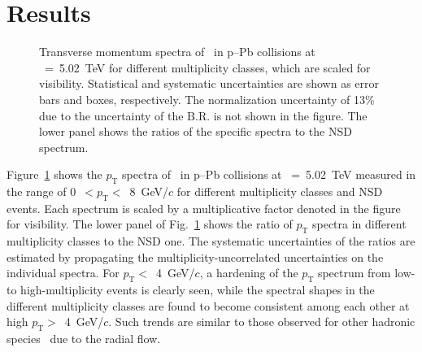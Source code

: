 
\section {Results}
\label{sec:results}

\begin{figure}[!hbt]
	\centering
	\caption{ Transverse momentum spectra of \fzero~in p--Pb collisions at \snn~=~5.02~TeV for different multiplicity classes, which are scaled for visibility. Statistical and systematic uncertainties are shown as error bars and boxes, respectively. The normalization uncertainty of 13\% due to the uncertainty of the $\mathrm{B.R.}$ is not shown in the figure. The lower panel shows the ratios of the specific spectra to the NSD spectrum. }
	\label{fig:pt}
\end{figure}

Figure~\ref{fig:pt} shows the $p_{\mathrm{T}}$ spectra of \fzero~in p--Pb collisions at \snn~=~5.02~TeV measured in the range of 0~$<p_{\mathrm{T}}<$~8~GeV/$c$ for different multiplicity classes and NSD events. Each spectrum is scaled by a multiplicative factor denoted in the figure for visibility. The lower panel of Fig.~\ref{fig:pt} shows the ratio of $p_{\mathrm{T}}$ spectra in different multiplicity classes to the NSD one. The systematic uncertainties of the ratios are estimated by propagating the multiplicity-uncorrelated uncertainties on the individual spectra. For $p_{\mathrm{T}}<$~4~GeV/$c$, a hardening of the $p_{\mathrm{T}}$ spectrum from low- to high-multiplicity events is clearly seen, while the spectral shapes in the different multiplicity classes are found to become consistent among each other at high $p_{\mathrm{T}}>$~4~GeV/$c$. Such trends are similar to those observed for other hadronic species~\cite{Schnedermann:1993ws, ALICE:2019hno} due to the radial flow.

